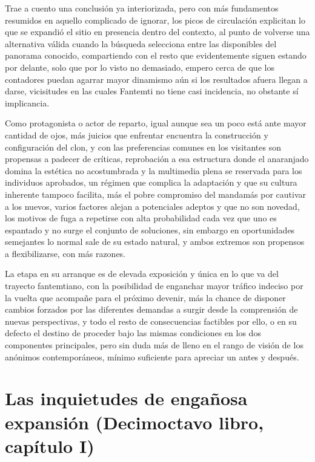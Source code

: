 \documentclass[
]{book}
\begin{document}
Trae a cuento una conclusión ya interiorizada, pero con más fundamentos resumidos en aquello complicado de ignorar, los picos de circulación explicitan lo que se expandió el sitio en presencia dentro del contexto, al punto de volverse una alternativa válida cuando la búsqueda selecciona entre las disponibles del panorama conocido, compartiendo con el resto que evidentemente siguen estando por delante, solo que por lo visto no demasiado, empero cerca de que los contadores puedan agarrar mayor dinamismo aún si los resultados afuera llegan a darse, vicisitudes en las cuales Fantemti no tiene casi incidencia, no obstante sí implicancia.

Como protagonista o actor de reparto, igual aunque sea un poco está ante mayor cantidad de ojos, más juicios que enfrentar encuentra la construcción y configuración del clon, y con las preferencias comunes en los visitantes son propensas a padecer de críticas, reprobación a esa estructura donde el anaranjado domina la estética no acostumbrada y la multimedia plena se reservada para los individuos aprobados, un régimen que complica la adaptación y que su cultura inherente tampoco facilita, más el pobre compromiso del mandamás por cautivar a los nuevos, varios factores alejan a potenciales adeptos y que no son novedad, los motivos de fuga a repetirse con alta probabilidad cada vez que uno es espantado y no surge el conjunto de soluciones, sin embargo en oportunidades semejantes lo normal sale de su estado natural, y ambos extremos son propensos a flexibilizarse, con más razones.

La etapa en su arranque es de elevada exposición y única en lo que va del trayecto fantemtiano, con la posibilidad de enganchar mayor tráfico indeciso por la vuelta que acompañe para el próximo devenir, más la chance de disponer cambios forzados por las diferentes demandas a surgir desde la comprensión de nuevas perspectivas, y todo el resto de consecuencias factibles por ello, o en su defecto el destino de proceder bajo las mismas condiciones en los dos componentes principales, pero sin duda más de lleno en el rango de visión de los anónimos contemporáneos, mínimo suficiente para apreciar un antes y después.

\hypertarget{las-inquietudes-de-engauxf1osa-expansiuxf3n-decimoctavo-libro-capuxedtulo-i}{%
\section{Las inquietudes de engañosa expansión (Decimoctavo libro, capítulo I)}\label{las-inquietudes-de-engauxf1osa-expansiuxf3n-decimoctavo-libro-capuxedtulo-i}}
\end{document}

